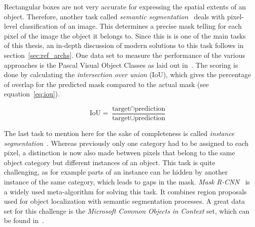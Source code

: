 Rectangular boxes are not very accurate for expressing the spatial extents of an object. Therefore, another task called \emph{semantic segmentation}~\cite{weakseg15} deals with pixel-level classification of an image. This determines a precise mask telling for each pixel of the image the object it belongs to. Since this is is one of the main tasks of this thesis, an in-depth discussion of modern solutions to this task follows in section~\ref{sec:ref_archs}. One data set to measure the performance of the various approaches is the Pascal Visual Object Classes as laid out in~\cite{pascal_voc15}. The scoring is done by calculating the \emph{intersection over union} (IoU), which gives the percentage of overlap for the predicted mask compared to the actual mask (see equation~\ref{eq:iou}).

\begin{equation}
    \label{eq:iou}
    \text{IoU} = \frac{\text{target} \cap \text{prediction}}{\text{target} \cup \text{prediction}}
\end{equation}

The last task to mention here for the sake of completeness is called \emph{instance segmentation}~\cite{mask-rcnn14}. Whereas previously only one category had to be assigned to each pixel, a distinction is now also made between pixels that belong to the same object category but different instances of an object. This task is quite challenging, as for example parts of an instance can be hidden by another instance of the same category, which leads to gaps in the mask. \emph{Mask R-CNN}~\cite{mask-rcnn14} is a widely used meta-algorithm for solving this task. It combines region proposals used for object localization with semantic segmentation processes. A great data set for this challenge is the \emph{Microsoft Common Objects in Context} set, which can be found in~\cite{coco15}.

